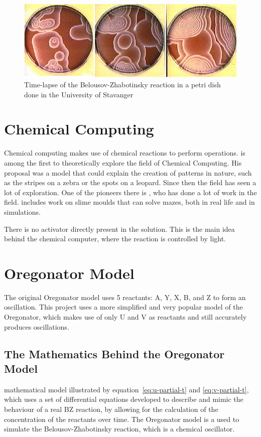 \begin{figure}[H]
    \centering
    \includegraphics[width=0.75\linewidth]{images/BZWaves.jpg}
    \caption{Time-lapse of the Belousov-Zhabotinsky reaction in a petri dish done in the University of Stavanger}
    \label{fig:bz-reaction-pattern}
\end{figure}

\section{Chemical Computing}
Chemical computing makes use of chemical reactions to perform operations. 
\cite{Turing1952} is among the first to theoretically explore the field of Chemical Computing. 
His proposal was a model that could explain the creation of patterns in nature, such as the stripes on a zebra or the spots on a leopard.
Since then the field has seen a lot of exploration. One of the pioneers there is \cite{adamatzky2005reaction}, who has done a lot of work in the field. 
\cite{adamatzky2019brief} includes work on slime moulds that can solve mazes, both in real life and in simulations.

There is no activator directly present in the solution. This is the main idea behind the chemical computer, where the reaction is controlled by light. 
\citep{reddy1995effect}

\section{Oregonator Model} 
The original Oregonator model uses 5 reactants: A, Y, X, B, and Z to form an oscillation. This project uses a more simplified and very popular model of the Oregonator, which makes use of only U and V as reactants and still accurately produces oscillations. 
\subsection{The Mathematics Behind the Oregonator Model}\label{sec:oregonator-math}
\cite{field2007oregonator} mathematical model illustrated by equation~\ref{eq:u-partial-t} and \ref{eq:v-partial-t}, which uses a set of differential equations developed to describe and mimic the behaviour of a real BZ reaction, by allowing for the calculation of the concentration of the reactants over time.
The Oregonator model is a used to simulate the Belousov-Zhabotinsky reaction, which is a chemical oscillator.

